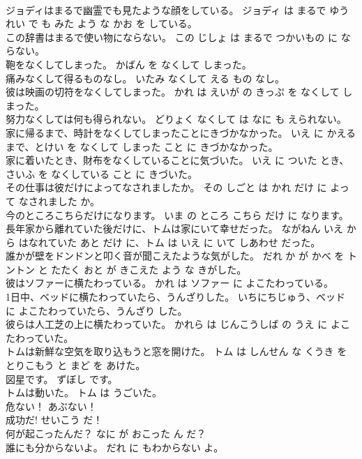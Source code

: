 \documentclass[8pt]{extreport}
\begin{document}
\begin{CJK}{UTF8}{min}
\\	ジョディはまるで幽霊でも見たような顔をしている。	ジョディ は まるで ゆうれい で も みた よう な かお を している。	
\\	この辞書はまるで使い物にならない。	この じしょ は まるで つかいもの に ならない。	
\\	鞄をなくしてしまった。	かばん を なくして しまった。	
\\	痛みなくして得るものなし。	いたみ なくして える もの なし。	
\\	彼は映画の切符をなくしてしまった。	かれ は えいが の きっぷ を なくして しまった。	
\\	努力なくしては何も得られない。	どりょく なくして は なに も えられない。	
\\	家に帰るまで、時計をなくしてしまったことにきづかなかった。	いえ に かえる まで、とけい を なくして しまった こと に きづかなかった。	
\\	家に着いたとき、財布をなくしていることに気づいた。	いえ に ついた とき、さいふ を なくしている こと に きづいた。	
\\	その仕事は彼だけによってなされましたか。	その しごと は かれ だけ に よって なされました か。	
\\	今のところこちらだけになります。	いま の ところ こちら だけ に なります。	
\\	長年家から離れていた後だけに、トムは家にいて幸せだった。	ながねん いえ から はなれていた あと だけ に、トム は いえ に いて しあわせ だった。	
\\	誰かが壁をドンドンと叩く音が聞こえたような気がした。	だれ か が かべ を トントン と たたく おと が きこえた よう な きがした。	
\\	彼はソファーに横たわっている。	かれ は ソファー に よこたわっている。	
\\	1日中、ベッドに横たわっていたら、うんざりした。	いちにちじゅう、ベッド に よこたわっていたら、うんざり した。	
\\	彼らは人工芝の上に横たわっていた。	かれら は じんこうしば の うえ に よこたわっていた。	
\\	トムは新鮮な空気を取り込もうと窓を開けた。	トム は しんせん な くうき を とりこもう と まど を あけた。	
\\	図星です。	ずぼし です。	
\\	トムは動いた。	トム は うごいた。	
\\	危ない！	あぶない！	
\\	成功だ!	せいこう だ！	
\\	何が起こったんだ？	なに が おこった ん だ？	
\\	誰にも分からないよ。	だれ に もわからない よ。	

\end{CJK}
\end{document}
